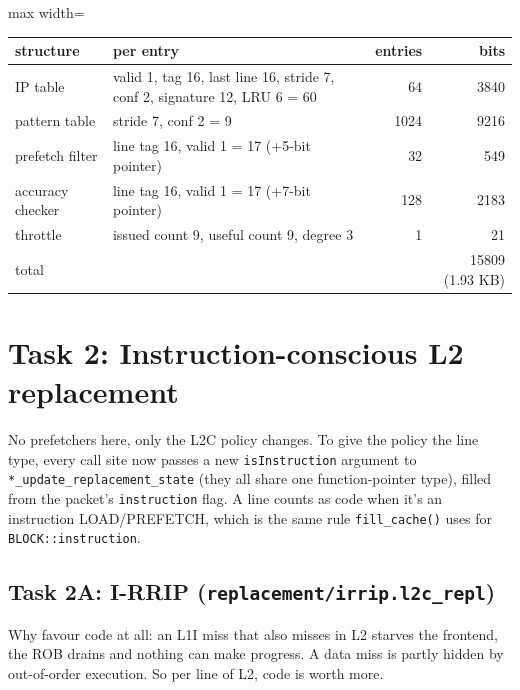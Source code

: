 \documentclass[10pt]{article}
\begin{document}
\begin{center}
\begin{adjustbox}{max width=\linewidth}
\begin{tabular}{@{}llrr@{}}
\toprule
\textbf{structure} & \textbf{per entry} & \textbf{entries} & \textbf{bits} \\
\midrule
IP table & valid 1, tag 16, last line 16, stride 7, conf 2, signature 12, LRU 6 = 60 & 64 & 3840 \\
pattern table & stride 7, conf 2 = 9 & 1024 & 9216 \\
prefetch filter & line tag 16, valid 1 = 17 (+5-bit pointer) & 32 & 549 \\
accuracy checker & line tag 16, valid 1 = 17 (+7-bit pointer) & 128 & 2183 \\
throttle & issued count 9, useful count 9, degree 3 & 1 & 21 \\
total &  &  & 15809 (1.93 KB) \\
\bottomrule
\end{tabular}
\end{adjustbox}
\end{center}


\clearpage
\section{Task 2: Instruction-conscious L2 replacement}

No prefetchers here, only the L2C policy changes. To give the policy the line type, every call site now passes a new \texttt{isInstruction} argument to \texttt{*\_update\_replacement\_state} (they all share one function-pointer type), filled from the packet's \texttt{instruction} flag. A line counts as code when it's an instruction LOAD/PREFETCH, which is the same rule \texttt{fill\_cache()} uses for \texttt{BLOCK::instruction}.


\subsection{Task 2A: I-RRIP (\texttt{replacement/irrip.l2c\_repl})}

Why favour code at all: an L1I miss that also misses in L2 starves the frontend, the ROB drains and nothing can make progress. A data miss is partly hidden by out-of-order execution. So per line of L2, code is worth more.
\end{document}
